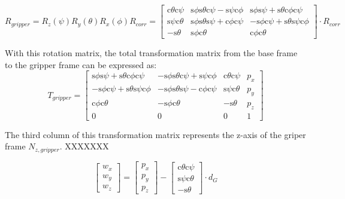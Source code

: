 \documentclass[twoside]{article}
\renewcommand{\c}{\text{c}}
\newcommand{\s}{\text{s}}
\begin{document}
\begin{equation}
  R_{gripper} = R_z(\psi) R_y(\theta) R_x(\phi) R_{corr}
=
  \begin{bmatrix}
    \c\theta \c\psi& \s\phi \s\theta \c\psi - \s\psi \c\phi&  \s\phi \s\psi + \s\theta \c\phi \c\psi \\
    \s\psi \c\theta& \s\phi \s\theta \s\psi + \c\phi \c\psi& -\s\phi \c\psi + \s\theta \s\psi \c\phi \\
          -\s\theta&                        \s\phi \c\theta&                         \c\phi \c\theta
  \end{bmatrix}
  \cdot R_{corr}
\end{equation}

With this rotation matrix, the total transformation matrix from the base frame to the gripper
frame can be expressed as:
\begin{equation}
  T_{gripper} =
  \begin{bmatrix}
     \s\phi\s\psi + \s\theta\c\phi\c\psi & -\s\phi\s\theta\c\psi + \s\psi\c\phi & \c\theta\c\psi & p_x \\
    -\s\phi\c\psi + \s\theta\s\psi\c\phi & -\s\phi\s\theta\s\psi - \c\phi\c\psi & \s\psi\c\theta & p_y \\
     \c\phi\c\theta                      & -\s\phi\c\theta                      & -\s\theta      & p_z \\
                                       0 &                                    0 &              0 &   1
  \end{bmatrix}
\end{equation}

The third column of this transformation matrix represents the z-axis of the griper frame $N_{z,gripper}$.
XXXXXXX

\begin{equation}
  \begin{bmatrix}
    w_x \\ w_y \\ w_z
  \end{bmatrix}
  =
  \begin{bmatrix}
    p_x \\ p_y \\ p_z
  \end{bmatrix}
  -
  \begin{bmatrix}
    \c\theta\c\psi \\ \s\psi\c\theta \\ -\s\theta
  \end{bmatrix}
  \cdot d_G
\end{equation}
\end{document}
